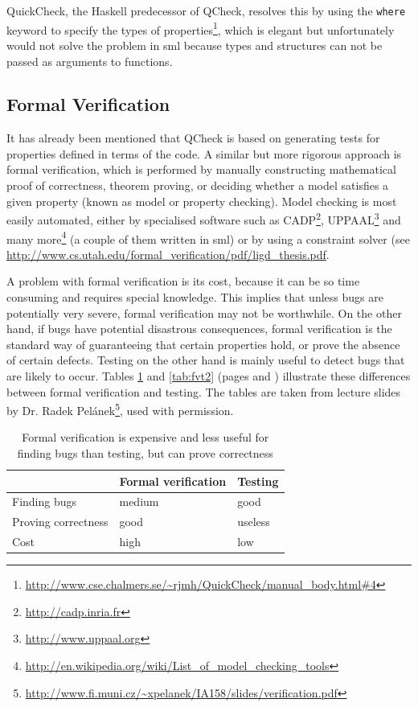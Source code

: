 \documentclass[11pt]{article}
\begin{document}
QuickCheck, the Haskell predecessor of QCheck, resolves this by using the \texttt{where} keyword to specify the types of properties\footnote{\url{http://www.cse.chalmers.se/~rjmh/QuickCheck/manual\_body.html\#4}}, which is elegant but unfortunately would not solve the problem in \gls{sml} because types and structures can not be passed as arguments to functions. %

\subsection{Formal Verification}
\label{subsec:formalverification}

It has already been mentioned that QCheck is based on generating tests for properties defined in terms of the code. A similar but more rigorous approach is formal verification, which is performed by manually constructing mathematical proof of correctness, theorem proving, or deciding whether a model satisfies a given property (known as model or property checking). Model checking is most easily automated, either by specialised software such as CADP\footnote{\url{http://cadp.inria.fr}}, UPPAAL\footnote{\url{http://www.uppaal.org}} and many more\footnote{\url{http://en.wikipedia.org/wiki/List_of_model_checking_tools}} (a couple of them written in \gls{sml}) or by using a constraint solver (see \url{http://www.cs.utah.edu/formal\_verification/pdf/ligd\_thesis.pdf}. %

A problem with formal verification is its cost, because it can be so time consuming and requires special knowledge. This implies that unless bugs are potentially very severe, formal verification may not be worthwhile. On the other hand, if bugs have potential disastrous consequences, formal verification is the standard way of guaranteeing that certain properties hold, or prove the absence of certain defects. Testing on the other hand is mainly useful to detect bugs that are likely to occur. Tables \ref{tab:fvt} and \ref{tab:fvt2} (pages \pageref{tab:fvt} and \pageref{tab:fvt2}) illustrate these differences between formal verification and testing. The tables are taken from lecture slides by Dr. Radek Pelánek\footnote{\url{http://www.fi.muni.cz/~xpelanek/IA158/slides/verification.pdf}}, used with permission.

\begin{table}
  \centering
    \begin{tabular}{ l | l l}
    & Formal verification & Testing \\ \hline
    Finding bugs & medium & good \\
    Proving correctness & good & useless \\
    Cost & high & low \\
    \end{tabular}
  \caption{Formal verification is expensive and less useful for finding bugs than testing, but can prove correctness}
  \label{tab:fvt}
\end{table}
\end{document}
